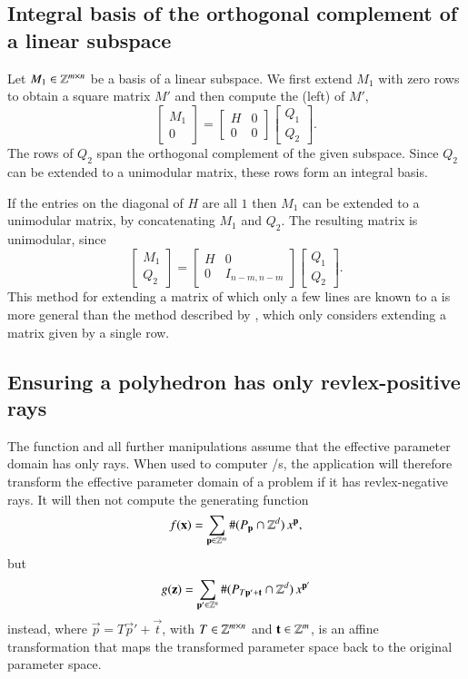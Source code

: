 \subsection{Integral basis of the orthogonal complement of a linear subspace}
\label{s:completion}

Let $M_1 \in \mathbb{Z}^{m \times n}$ be a basis of a linear subspace.
We first extend $M_1$ with zero rows to obtain a square matrix $M'$
and then compute the (left)  of $M'$,
$$
\begin{bmatrix}
M_1 \\ 0
\end{bmatrix}
=
\begin{bmatrix}
H & 0 \\ 0 & 0
\end{bmatrix}
\begin{bmatrix}
Q_1 \\ Q_2
\end{bmatrix}
.
$$
The rows of $Q_2$ span the orthogonal complement of the given subspace.
Since $Q_2$ can be extended to a unimodular matrix, these rows form
an integral basis.

If the entries on the diagonal of $H$ are all $1$ then $M_1$
can be extended to a unimodular matrix, by concatenating $M_1$ and $Q_2$.
The resulting matrix is unimodular, since
$$
\begin{bmatrix}
M_1 \\ Q_2
\end{bmatrix}
=
\begin{bmatrix}
H & 0 \\ 0 & I_{n-m,n-m}
\end{bmatrix}
\begin{bmatrix}
Q_1 \\ Q_2
\end{bmatrix}
.
$$
This method for extending a matrix of which
only a few lines are known to a 
is more general than the method described by ,
which only considers extending a matrix given by a single row.

\subsection{Ensuring a polyhedron has only revlex-positive rays}
\label{s:revlexpos}

The  function and all
further  manipulations assume that the effective
parameter domain has only  rays.
When used to computer \rgf/s, the 
application will therefore transform the effective parameter domain
of a problem if it has revlex-negative rays.
It will then not compute the generating function
$$
f(\vec x) = \sum_{\vec p \in \ZZ^m} \#(P_{\vec p} \cap \ZZ^d) \, x^{\vec p}
,
$$
but
$$
g(\vec z) = \sum_{\vec p' \in \ZZ^n}
		\#(P_{T \vec p' + \vec t} \cap \ZZ^d) \, x^{\vec p'}
$$
instead, where $\vec p = T \vec p' + \vec t$,
with $T \in \mathbb{Z}^{m \times n}$ and $\vec t \in \ZZ^m$, is an affine transformation
that maps the transformed parameter space back to the original parameter space.

